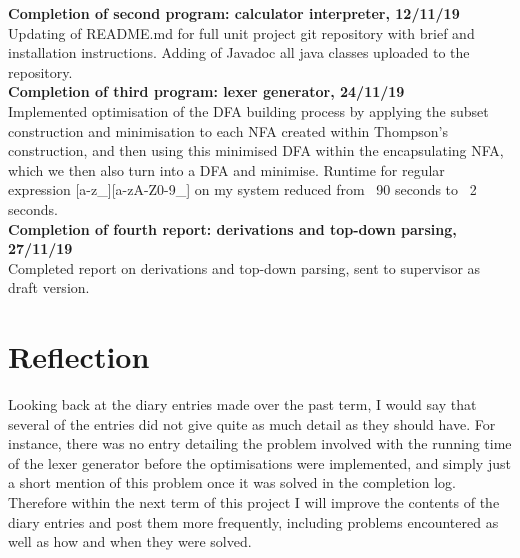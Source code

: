 \documentclass[a4paper, 11pt]{article}
\begin{document}
\textbf{Completion of second program: calculator interpreter, 12/11/19}\\
Updating of README.md for full unit project git repository with brief and installation instructions. Adding of Javadoc all java classes uploaded to the repository.
\\\newline
\textbf{Completion of third program: lexer generator, 24/11/19}\\
Implemented optimisation of the DFA building process by applying the subset construction and minimisation to each NFA created within Thompson’s construction, and then using this minimised DFA within the encapsulating NFA, which we then also turn into a DFA and minimise. Runtime for regular expression [a-z\_][a-zA-Z0-9\_] on my system reduced from ~90 seconds to ~2 seconds.
\\\newline
\textbf{Completion of fourth report: derivations and top-down parsing, 27/11/19}\\
Completed report on derivations and top-down parsing, sent to supervisor as draft version.


\section{Reflection}
Looking back at the diary entries made over the past term, I would say that several of the entries did not give quite as much detail as they should have. For instance, there was no entry detailing the problem involved with the running time of the lexer generator before the optimisations were implemented, and simply just a short mention of this problem once it was solved in the completion log. Therefore within the next term of this project I will improve the contents of the diary entries and post them more frequently, including problems encountered as well as how and when they were solved.

\end{document}
